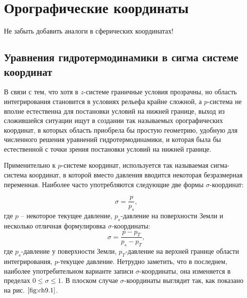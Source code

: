 \chapter{{\color{done}Орографические координаты}}

\begin{warn}
    Не забыть добавить аналоги в сферических координатах!
\end{warn}

\section{{\color{done}Уравнения гидротермодинамики в сигма системе координат}}

В связи с тем, что хотя в $z$-системе граничные условия прозрачны, но область интегрирования становится в условиях рельефа крайне сложной, а $p$-система не вполне естественна для постановки условий на нижней границе, выход из сложившейся ситуации ищут в создании так называемых орографических координат, в которых область приобрела бы простую геометрию, удобную для численного решения уравнений гидротермодинамики, и которая была бы естественной с точки зрения постановки условий на нижней границе.

Применительно к $p$-системе координат, используется так называемая сигма-система координат, в которой вместо давления вводится некоторая безразмерная переменная. Наиболее часто употребляются следующие две формы $\sigma$-координат: 

\begin{equation}
\label{eq:sigma}
    \sigma=\frac{p}{p_s},
\end{equation}
где $p$ -- некоторое текущее давление, $p_s$-давление на поверхности Земли и несколько отличная формулировка $\sigma$-координаты:
\begin{equation}
    \sigma=\frac{p-p_T}{p_s-p_T},
\end{equation}
где $p_s$-давление у поверхности Земли, $p_T$-давление на верхней границе области интегрирования, $p$-текущее давление. Нетрудно заметить, что в последнем, наиболее употребительном варианте записи $\sigma$-координаты, она изменяется в пределах $0\leq\sigma\leq1$. В плоском случае $\sigma$-координаты выглядит так, как показано на рис. $\ref{fig:ch9.1}$.


